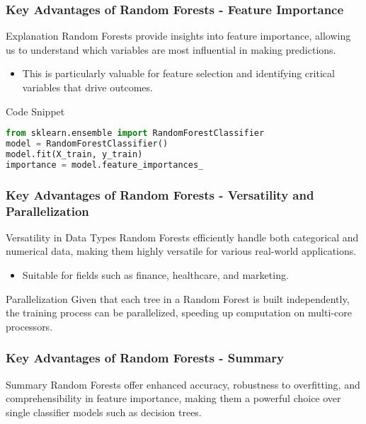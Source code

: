 \documentclass[aspectratio=169]{beamer}
\begin{document}
\begin{frame}[fragile]
    \frametitle{Key Advantages of Random Forests - Feature Importance}
    \begin{block}{Explanation}
        Random Forests provide insights into feature importance, allowing us to understand which variables are most influential in making predictions.
    \end{block}
    \begin{itemize}
        \item This is particularly valuable for feature selection and identifying critical variables that drive outcomes.
    \end{itemize}
    \begin{block}{Code Snippet}
        \begin{lstlisting}[language=Python]
from sklearn.ensemble import RandomForestClassifier
model = RandomForestClassifier()
model.fit(X_train, y_train)
importance = model.feature_importances_
        \end{lstlisting}
    \end{block}
\end{frame}

\begin{frame}[fragile]
    \frametitle{Key Advantages of Random Forests - Versatility and Parallelization}
    \begin{block}{Versatility in Data Types}
        Random Forests efficiently handle both categorical and numerical data, making them highly versatile for various real-world applications. 
        \begin{itemize}
            \item Suitable for fields such as finance, healthcare, and marketing.
        \end{itemize}
    \end{block}
    
    \begin{block}{Parallelization}
        Given that each tree in a Random Forest is built independently, the training process can be parallelized, 
        speeding up computation on multi-core processors.
    \end{block}
\end{frame}

\begin{frame}[fragile]
    \frametitle{Key Advantages of Random Forests - Summary}
    \begin{block}{Summary}
        Random Forests offer enhanced accuracy, robustness to overfitting, and comprehensibility in feature importance, 
        making them a powerful choice over single classifier models such as decision trees.
    \end{block}
\end{frame}
\end{document}
